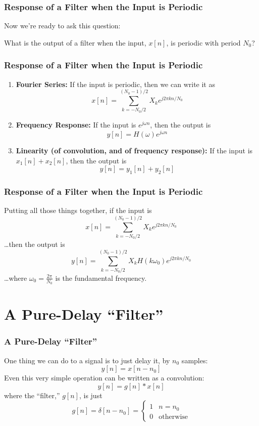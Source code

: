 \documentclass{beamer}
\begin{document}
\begin{frame}
  \frametitle{Response of a Filter when the Input is Periodic}

  Now we're ready to ask this question:
  \begin{block}{}
    What is the output of a filter when the  input, $x[n]$, is periodic with
    period $N_0$?
  \end{block}
\end{frame}

\begin{frame}
  \frametitle{Response of a Filter when the Input is Periodic}

  \begin{enumerate}
  \item {\bf Fourier Series:}
    If the input is periodic, then we can write  it as
    \[
    x[n] =\sum_{k=-N_0/2}^{(N_0-1)/2} X_k e^{j2\pi kn/N_0}
    \]
  \item {\bf Frequency Response:}
    If the input is $e^{j\omega n}$, then the output is
    \[
    y[n] = H(\omega)e^{j\omega n}
    \]
  \item {\bf Linearity (of convolution, and of frequency response):}
    If the input is $x_1[n]+x_2[n]$, then the output is
    \[
    y[n] = y_1[n]+y_2[n]
    \]
  \end{enumerate}
\end{frame}

\begin{frame}
  \frametitle{Response of a Filter when the Input is Periodic}

  Putting all those things together, if the input is
  \[
  x[n] =\sum_{k=-N_0/2}^{(N_0-1)/2} X_k e^{j2\pi kn/N_0}
  \]
  \ldots then the output is
  \[
  y[n] = \sum_{k=-N_0/2}^{(N_0-1)/2} X_k H(k\omega_0) e^{j2\pi kn/N_0}
  \]
  \ldots where $\omega_0=\frac{2\pi}{N_0}$ is the fundamental frequency.
\end{frame}


\section[Pure Delay]{A Pure-Delay ``Filter''}
\setcounter{subsection}{1}

\begin{frame}
  \frametitle{A Pure-Delay ``Filter''}

  One thing we can do to a signal is to just delay it, by $n_0$ samples:
  \[
  y[n] = x[n-n_0]
  \]
  Even this very simple operation can be written as a convolution:
  \[
  y[n]=g[n]\ast x[n]
  \]
  where the ``filter,'' $g[n]$, is just
  \[
  g[n]=\delta[n-n_0] = \begin{cases}
  1 & n=n_0\\
  0 & \mbox{otherwise}
  \end{cases}
  \]
\end{frame}
\end{document}

